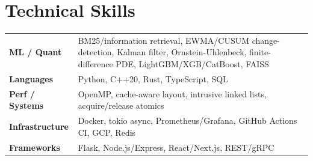 \documentclass[10pt]{article}
\begin{document}
\section*{Technical Skills}
\noindent
\begin{tabular}{@{}p{2.7cm}p{15.5cm}@{}}
\textbf{ML / Quant} & BM25/information retrieval, EWMA/CUSUM change-detection, Kalman filter, Ornstein-Uhlenbeck, finite-difference PDE, LightGBM/XGB/CatBoost, FAISS \\
\textbf{Languages} & Python, C++20, Rust, TypeScript, SQL \\
\textbf{Perf / Systems} & OpenMP, cache-aware layout, intrusive linked lists, acquire/release atomics \\
\textbf{Infrastructure} & Docker, tokio async, Prometheus/Grafana, GitHub Actions CI, GCP, Redis \\
\textbf{Frameworks} & Flask, Node.js/Express, React/Next.js, REST/gRPC \\
\end{tabular}
\end{document}
